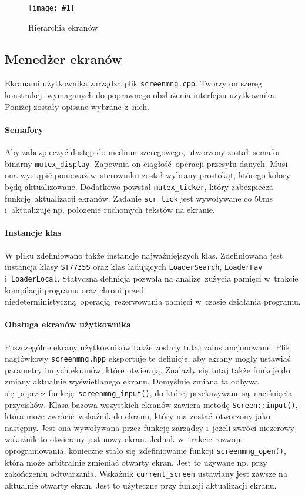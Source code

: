 \documentclass[polish]{aghengthesis}
\newcommand{\imgint}[4]{
	\begin{figure}[{#4}]
		\centering
		\texttt{[image: \#1]}
		\caption{#2}
		\label{#1}
	\end{figure}
}
\newcommand{\imgh}[3]{\imgint{#1}{#2}{#3}{H}}
\begin{document}
			\imgh{3/PicoRadio-screens}{Hierarchia ekranów}{0.55} %
			
		\subsection{Menedżer ekranów}
			Ekranami użytkownika zarządza plik \lstinline|screenmng.cpp|. Tworzy on szereg konstrukcji wymaganych do poprawnego obsłużenia interfejsu użytkownika. Poniżej zostały opisane wybrane z~nich.
			
			\paragraph{Semafory}
				Aby zabezpieczyć dostęp do medium szeregowego, utworzony został semafor binarny \lstinline|mutex_display|. Zapewnia on ciągłość operacji przesyłu danych. Musi ona wystąpić ponieważ w~sterowniku został wybrany prostokąt, którego kolory będą aktualizowane. Dodatkowo powstał \lstinline|mutex_ticker|, który zabezpiecza funkcję aktualizacji ekranów. Zadanie \lstinline|scr tick| jest wywoływane co 50ms i~aktualizuje np. położenie ruchomych tekstów na ekranie.
				
			\paragraph{Instancje klas}
				W pliku zdefiniowano także instancje najważniejszych klas. Zdefiniowana jest instancja klasy \lstinline|ST7735S| oraz klas ładujących \lstinline|LoaderSearch|, \lstinline|LoaderFav| i~\lstinline|LoaderLocal|. Statyczna definicja pozwala na analizę zużycia pamięci w~trakcie kompilacji programu oraz chroni przed niedeterministyczną operacją rezerwowania pamięci w~czasie działania programu.
				
			\paragraph{Obsługa ekranów użytkownika}
				Poszczególne ekrany użytkowników także zostały tutaj zainstancjonowane. Plik nagłówkowy \lstinline|screenmng.hpp| eksportuje te definicje, aby ekrany mogły ustawiać parametry innych ekranów, które otwierają. Znalazły się tutaj także funkcje do zmiany aktualnie wyświetlanego ekranu. Domyślnie zmiana ta odbywa się poprzez funkcję \lstinline|screenmng_input()|, do której przekazywane są naciśnięcia przycisków. Klasa bazowa wszystkich ekranów zawiera metodę \lstinline|Screen::input()|, która może zwrócić wskaźnik do ekranu, który ma zostać otworzony jako następny. Jest ona wywoływana przez funkcję zarządcy i~jeżeli zwróci niezerowy wskaźnik to otwierany jest nowy ekran. Jednak w~trakcie rozwoju oprogramowania, konieczne stało się zdefiniowanie funkcji \lstinline|screenmng_open()|, która może arbitralnie zmieniać otwarty ekran. Jest to używane np. przy zakończeniu odtwarzania. Wskaźnik \lstinline|current_screen| ustawiany jest zawsze na aktualnie otwarty ekran. Jest to użyteczne przy funkcji aktualizacji ekranu.
\end{document}
